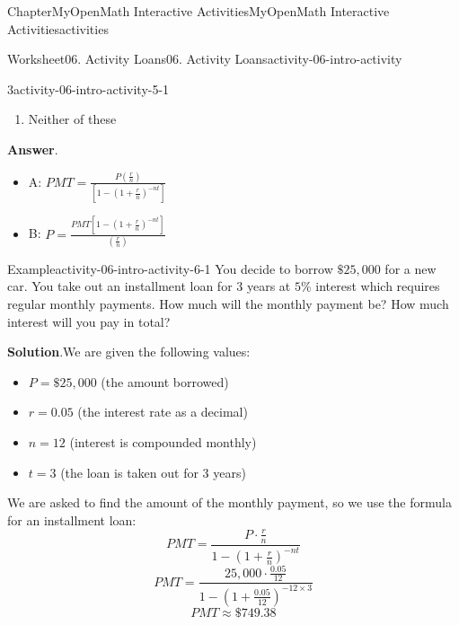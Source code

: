 \documentclass[oneside,10pt,]{book}
\newcommand{\blocktitlefont}{\relax}
\newcommand{\ptxlistdisc}{\raisebox{0.3ex}{\textbullet}}
\begin{document}
\begin{chapterptx}{Chapter}{MyOpenMath Interactive Activities}{}{MyOpenMath Interactive Activities}{}{}{activities}
\begin{worksheet-section}{Worksheet}{06. Activity Loans}{}{06. Activity Loans}{}{}{activity-06-intro-activity}
\begin{divisionexercise}{3}{}{}{activity-06-intro-activity-5-1}
\begin{enumerate}[label={(\alph*)}]
\item{}Neither of these%
\end{enumerate}
%
\par\smallskip%
\noindent\textbf{\blocktitlefont Answer}.\hypertarget{activity-06-intro-activity-5-1-2}{}\quad{}%
\begin{itemize}[label=\ptxlistdisc]
\item{}A: \(\displaystyle{P}{M}{T}=\frac{{{P}{\left(\frac{{r}}{{n}}\right)}}}{{{\left[{1}-{\left({1}+\frac{{r}}{{n}}\right)}^{{-{n}{t}}}\right]}}}\)%
\item{}B: \(\displaystyle{P}=\frac{{{P}{M}{T}{\left[{1}-{\left({1}+\frac{{r}}{{n}}\right)}^{{-{n}{t}}}\right]}}}{{{\left(\frac{{r}}{{n}}\right)}}}\)%
\end{itemize}
%
\end{divisionexercise}%
\clearpage
\begin{example}{Example}{}{activity-06-intro-activity-6-1}%
You decide to borrow \(\$25,000\) for a new car. You take out an installment loan for \(3\) years at \(5\%\) interest which requires regular monthly payments. How much will the monthly payment be? How much interest will you pay in total?%
\par\smallskip%
\noindent\textbf{\blocktitlefont Solution}.\hypertarget{activity-06-intro-activity-6-1-2}{}\quad{}We are given the following values:%
\begin{itemize}[label=\ptxlistdisc]
\item{}\(P = \$25,000\) (the amount borrowed)%
\item{}\(r = 0.05\) (the interest rate as a decimal)%
\item{}\(n = 12\) (interest is compounded monthly)%
\item{}\(t = 3\) (the loan is taken out for 3 years)%
\end{itemize}
%
\par
We are asked to find the amount of the monthly payment, so we use the formula for an installment loan:%
\begin{equation*}
PMT = \frac{P \cdot \frac{r}{n}}{1 - \left(1 + \frac{r}{n}\right)^{-nt}}
\end{equation*}
%
\begin{equation*}
PMT = \frac{25,000 \cdot \frac{0.05}{12}}{1 - \left(1 + \frac{0.05}{12}\right)^{-12 \times 3}}
\end{equation*}
%
\begin{equation*}
PMT \approx \$749.38
\end{equation*}
%
\par

\end{example}
\end{worksheet-section}
\end{chapterptx}
\end{document}
